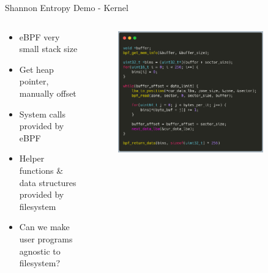 \documentclass[aspectratio=169]{beamer}
\begin{document}
\begin{frame}{Shannon Entropy Demo - Kernel}
        \begin{columns}
            \begin{column}{0.40\textwidth}
                \footnotesize
                \begin{itemize}
                    \item eBPF very small stack size
                    \item Get heap pointer, manually offset
                    \item System calls provided by eBPF
                    \item Helper functions \& data structures provided
                          by filesystem
                    \item Can we make user programs agnostic to filesystem?
                \end{itemize}
            \end{column}
            \begin{column}{0.60\textwidth}
                \begingroup
                \small
                \begin{figure}
                    \centering
                    \includegraphics[width=0.85\textwidth]{resources/images/demo-kernel-3.png}
                \end{figure}
                \endgroup
            \end{column}
        \end{columns}
\end{frame}
\end{document}
